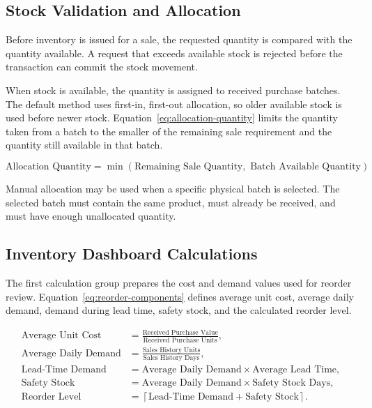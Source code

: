 \subsection{Stock Validation and Allocation}
Before inventory is issued for a sale, the requested quantity is compared with the quantity available. A request that exceeds available stock is rejected before the transaction can commit the stock movement.

When stock is available, the quantity is assigned to received purchase batches. The default method uses first-in, first-out allocation, so older available stock is used before newer stock. Equation~\ref{eq:allocation-quantity} limits the quantity taken from a batch to the smaller of the remaining sale requirement and the quantity still available in that batch.

\begin{equation}
\label{eq:allocation-quantity}
\text{Allocation Quantity} = \min(\text{Remaining Sale Quantity},\text{ Batch Available Quantity})
\end{equation}

Manual allocation may be used when a specific physical batch is selected. The selected batch must contain the same product, must already be received, and must have enough unallocated quantity.

\subsection{Inventory Dashboard Calculations}
The first calculation group prepares the cost and demand values used for reorder review. Equation~\ref{eq:reorder-components} defines average unit cost, average daily demand, demand during lead time, safety stock, and the calculated reorder level.

\begin{equation}
\label{eq:reorder-components}
\begin{aligned}
\text{Average Unit Cost} &= \frac{\text{Received Purchase Value}}{\text{Received Purchase Units}},\\
\text{Average Daily Demand} &= \frac{\text{Sales History Units}}{\text{Sales History Days}},\\
\text{Lead-Time Demand} &= \text{Average Daily Demand}\times\text{Average Lead Time},\\
\text{Safety Stock} &= \text{Average Daily Demand}\times\text{Safety Stock Days},\\
\text{Reorder Level} &= \left\lceil\text{Lead-Time Demand}+\text{Safety Stock}\right\rceil.
\end{aligned}
\end{equation}

